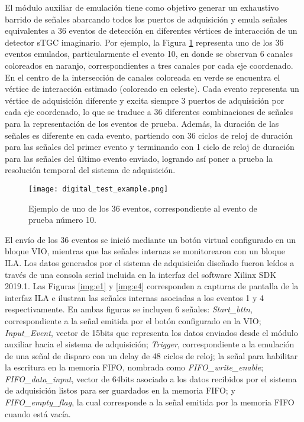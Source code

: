 El módulo auxiliar de emulación tiene como objetivo generar un exhaustivo barrido de señales abarcando todos los puertos de adquisición y emula señales equivalentes a 36 eventos de detección en diferentes vértices de interacción de un detector sTGC imaginario. Por ejemplo, la Figura \ref{img:digital_test_example} representa uno de los 36 eventos emulados, particularmente el evento 10, en donde se observan 6 canales coloreados en naranjo, correspondientes a tres canales por cada eje coordenado. En el centro de la intersección de canales coloreada en verde se encuentra el vértice de interacción estimado (coloreado en celeste). Cada evento representa un vértice de adquisición diferente y excita siempre 3 puertos de adquisición por cada eje coordenado, lo que se traduce a 36 diferentes combinaciones de señales para la representación de los eventos de prueba. Además, la duración de las señales es diferente en cada evento, partiendo con 36 ciclos de reloj de duración para las señales del primer evento y terminando con 1 ciclo de reloj de duración para las señales del último evento enviado, logrando así poner a prueba la resolución temporal del sistema de adquisición.
	
	\begin{figure}[h]
		\centering
		\texttt{[image: digital\_test\_example.png]}
		\caption{Ejemplo de uno de los 36 eventos, correspondiente al evento de prueba número 10. }
		\label{img:digital_test_example}
	\end{figure}
	
	El envío de los 36 eventos se inició mediante un botón virtual configurado en un bloque VIO, mientras que las señales internas se monitorearon con un bloque ILA. Los datos generados por el sistema de adquisición diseñado fueron leídos a través de una consola serial incluida en la interfaz del software Xilinx SDK 2019.1. Las Figuras \ref{img:e1} y \ref{img:e4} corresponden a capturas de pantalla de la interfaz ILA e ilustran las señales internas asociadas a los eventos 1 y 4 respectivamente. En ambas figuras se incluyen 6 señales: \textit{Start\_bttn}, correspondiente a la señal emitida por el botón configurado en la VIO; \textit{Input\_Event}, vector de 15bits que representa los datos enviados desde el módulo auxiliar hacia el sistema de adquisición; \textit{Trigger}, correspondiente a la emulación de una señal de disparo con un delay de 48 ciclos de reloj; la señal para habilitar la escritura en la memoria FIFO, nombrada como \textit{FIFO\_write\_enable}; \textit{FIFO\_data\_input}, vector de 64bits asociado a los datos recibidos por el sistema de adquisición listos para ser guardados en la memoria FIFO; y \textit{FIFO\_empty\_flag}, la cual corresponde a la señal emitida por la memoria FIFO cuando está vacía.
	

